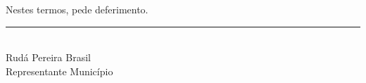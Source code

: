 Nestes termos, pede deferimento.

\centering
\begin{minipage}{0.45\textwidth}
\vspace{2cm}
\centering
\rule{\linewidth}{0.4pt}\\
Rudá Pereira Brasil\\
{\small Representante Município}
\end{minipage}
